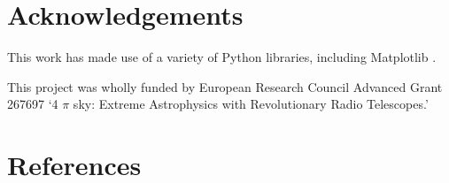 \documentclass[5p,authoryear]{elsarticle}
\begin{document}
% 
% 






\section*{Acknowledgements}

This work has made use of a variety of Python libraries, including Matplotlib
\citep{Hunter2007}.

This project was wholly funded by European Research Council Advanced Grant 267697 
`4 $\pi$ sky: Extreme Astrophysics with Revolutionary Radio Telescopes.’


\section*{References}
% 


\end{document}
